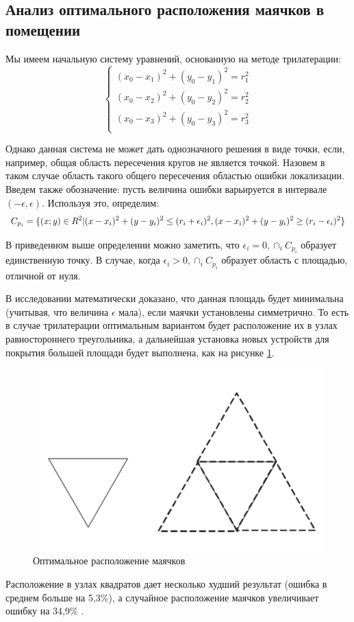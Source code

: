 \subsection{Анализ оптимального расположения маячков в помещении}

Мы имеем начальную систему уравнений, основанную на методе трилатерации:
\[
\begin{cases}
    (x_0-x_1)^2+(y_0-y_1)^2=r_1^2 \\
    (x_0-x_2)^2+(y_0-y_2)^2=r_2^2 \\
    (x_0-x_3)^2+(y_0-y_3)^2=r_3^2 \\
\end{cases}
\]

Однако данная система не может дать однозначного решения в виде точки, если, например, общая область пересечения кругов не является точкой. Назовем в таком случае область такого общего пересечения областью ошибки локализации. Введем также обозначение: пусть величина ошибки варьируется в интервале $(-\epsilon, \epsilon)$. Используя это, определим:
\[
C_{p_i}=
    \{ 
        (x; y) \in R^2 | (x-x_i)^2+(y-y_i)^2 \leq (r_i+\epsilon_i)^2, \\
                                             (x-x_i)^2+(y-y_i)^2 \geq (r_i-\epsilon_i)^2 
    \}
\]

В приведенном выше определении можно заметить, что $\epsilon_i=0, \cap_i C_{p_i}$ образует единственную точку. В случае, когда $\epsilon_i>0, \cap_i C_{p_i}$ образует область с площадью, отличной от нуля.

В исследовании \cite{han2009reference} математически доказано, что данная площадь будет минимальна (учитывая, что величина $\epsilon$ мала), если маячки установлены симметрично. То есть в случае трилатерации оптимальным вариантом будет расположение их в узлах равностороннего треугольника, а дальнейшая установка новых устройств для покрытия большей площади будет выполнена, как на рисунке \ref{optimum_placement}.

\begin{figure}[ht]
    \centering
    \includegraphics[scale=0.6]{img/triangles}
    \caption{Оптимальное расположение маячков}
    \label{optimum_placement}
\end{figure}

Расположение в узлах квадратов дает несколько худший результат (ошибка в среднем больше на 5,3\%), а случайное расположение маячков увеличивает ошибку на 34,9\% \cite{bulusu2001adaptive}.
